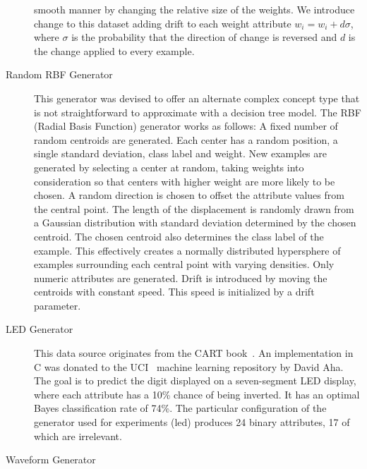 \begin{description}
smooth manner by changing the relative size of the weights.
We introduce change to this dataset adding drift to each weight attribute 
 $w_i = w_i + d\sigma$,
where $\sigma$ is the probability that the direction of change is reversed and $d$ is
the change applied to every example.
\item[Random RBF Generator]%
{ This generator was devised to offer an alternate complex concept type that is not 
straightforward to approximate with a decision tree model.}
The RBF (Radial Basis Function) generator works as follows: A fixed number
of random centroids are generated. Each center has a random position,
a single standard deviation, class label and weight. New examples are 
generated by selecting a center at random, taking weights into consideration so
that centers with higher weight are more likely to be chosen. A random 
direction is chosen to offset the attribute values from the central point. The
length of the displacement is randomly drawn from a Gaussian distribution
with standard deviation determined by the chosen centroid. The chosen 
centroid also determines the class label of the example. This effectively creates a
normally distributed hypersphere of examples surrounding each central point
with varying densities. Only numeric attributes are generated. 
Drift is introduced by moving the centroids with constant speed. This speed is
initialized by a drift parameter.
\BEGINOMIT
 \item[LED Generator]%
This data source originates from the CART book~\cite{cart93}. An implementation in
C was donated to the UCI~\cite{uci} machine learning repository by David Aha. The
goal is to predict the digit displayed on a seven-segment LED display, where
each attribute has a 10\% chance of being inverted. It has an optimal Bayes
classification rate of 74\%. The particular configuration of the generator used
for experiments (led) produces 24 binary attributes, 17 of which are irrelevant.
 \item[Waveform Generator]%

\end{description}
